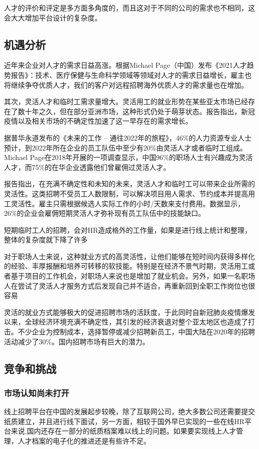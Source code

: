 \documentclass[master]{hduthesis}
\begin{document}
人才的评价和评定是多方面多角度的，而且这对于不同的公司的需求也不相同，这会大大增加平台设计的复杂度。
\subsection{机遇分析}
近年来企业对人才的需求日益高涨。根据Michael Page（中国）发布《2021人才趋势报告》：技术、医疗保健与生命科学领域等领域对人才的需求日益增长，雇主也将继续争夺优质人才，我们的客户对远程招聘海外优质人才的需求量也在增加。

其次，灵活人才和临时工需求量增大。灵活用工的就业形势在某些亚太市场已经存在了数十年之久，但在部分亚洲市场，这种形式仍处于萌芽状态。报告指出，新冠疫情以及相关市场的不确定性加速了这一早存在的需求增长。

据普华永道发布的《未来的工作 – 通往2022年的旅程》，46\%的人力资源专业人士预计，到2022年所在企业的员工队伍中至少有20\%由灵活人才或者临时工组成。Michael Page在2018年开展的一项调查显示，中国96\%的职场人士有兴趣成为灵活人才，而75\%的在华企业透露他们曾雇佣过灵活人才。

报告指出，在充满不确定性和未知的未来，灵活人才和临时工可以带来企业所需的灵活性。这类招聘不受员工人数限制，可以解决项目用人需求、节约成本并提高用工灵活性。雇主只需根据候选人实际工作的小时/天数来支付费用。数据显示，26\%的企业会雇佣短期灵活人才弥补现有员工队伍中的技能缺口。

短期临时工人的招聘，会对HR造成格外的工作量，如果是进行线上统计和整理，整体的复杂度就下降了许多

对于职场人士来说，这种就业方式的高灵活性，让他们能够在短时间内获得多样化的经验、丰厚报酬和培养可转移的软技能。特别是在经济不景气时期，灵活用工或者基于项目的工作机会，对职场人来说也是增加了就业机会。另外，如果一名职场人在尝试了灵活人才服务方式后发现自己并不适合，再重新回到全职工作岗位也很容易


灵活的就业方式能够极大的促进招聘市场的活跃度，于此同时自新冠肺炎疫情爆发以来，全球经济环境充满不确定性，其引发的经济衰退对整个亚太地区也造成了打击。不少企业为控制成本，选择暂停或减少招聘新员工，中国大陆在2020年的招聘活动减少了30\%。国内招聘市场有巨大的潜力。
\subsection{竞争和挑战}
\subsubsection{市场认知尚未打开}
线上招聘平台在中国的发展起步较晚，除了互联网公司，绝大多数公司还需要提交纸质建立，并且进行线下面试，另一方面，相较于国外早已实现的一些在线HR平台来说,国内还存在一部分的纸质档案难以线上的问题。如果要实现线上人才管理，人才档案的电子化的推进还是有些许不足。
\end{document}

